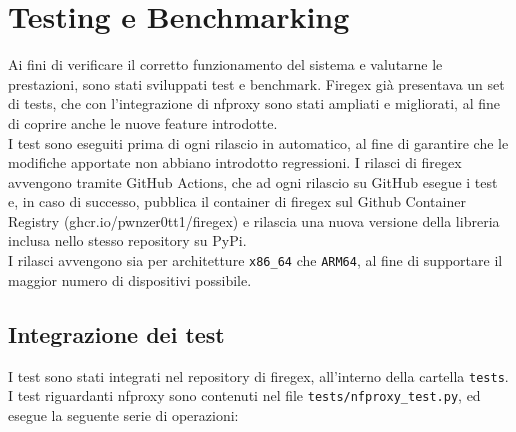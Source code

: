 \chapter{Testing e Benchmarking}

Ai fini di verificare il corretto funzionamento del sistema e valutarne le prestazioni, sono stati sviluppati test e benchmark.
Firegex già presentava un set di tests, che con l'integrazione di nfproxy sono stati ampliati e migliorati, al fine di coprire anche le nuove
feature introdotte.\\
I test sono eseguiti prima di ogni rilascio in automatico, al fine di garantire che le modifiche apportate non abbiano introdotto regressioni.
I rilasci di firegex avvengono tramite GitHub Actions, che ad ogni rilascio su GitHub esegue i test e, in caso di successo,
pubblica il container di firegex sul Github Container Registry (ghcr.io/pwnzer0tt1/firegex) e rilascia una nuova versione della libreria inclusa 
nello stesso repository su PyPi.\\
I rilasci avvengono sia per architetture \texttt{x86\_64} che \texttt{ARM64}, al fine di supportare il maggior numero di dispositivi possibile.\\

\section{Integrazione dei test}

I test sono stati integrati nel repository di firegex, all'interno della cartella \texttt{tests}.\\
I test riguardanti nfproxy sono contenuti nel file \texttt{tests/nfproxy\_test.py}, ed esegue la seguente serie di operazioni:

